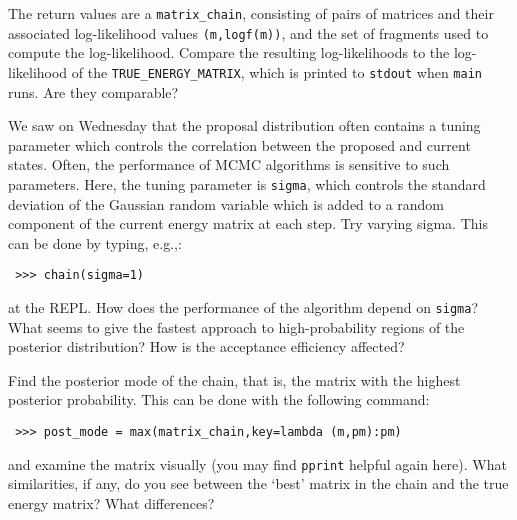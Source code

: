 \documentclass[11pt]{article}
\begin{document}
  The return values are a \texttt{matrix\_chain}, consisting of pairs of
  matrices and their associated log-likelihood values \texttt{(m,logf(m))},
  and the set of fragments used to compute the log-likelihood.
  Compare the resulting log-likelihoods to the log-likelihood of the
  \texttt{TRUE\_ENERGY\_MATRIX}, which is printed to \texttt{stdout} when \texttt{main} runs.
  Are they comparable?



  We saw on Wednesday that the proposal distribution often contains a
  tuning parameter which controls the correlation between the proposed
  and current states.  Often, the performance of MCMC algorithms is
  sensitive to such parameters.  Here, the tuning parameter is
  \texttt{sigma}, which controls the standard deviation of the Gaussian
  random variable which is added to a random component of the current
  energy matrix at each step.  Try varying sigma.  This can be done by
  typing, e.g.,:

\begin{verbatim}
 >>> chain(sigma=1)
\end{verbatim}

  at the REPL.  How does the performance of the algorithm depend on
  \texttt{sigma}?  What seems to give the fastest approach to
  high-probability regions of the posterior distribution?  How is the
  acceptance efficiency affected?

  Find the posterior mode of the chain, that is, the matrix with the
  highest posterior probability.  This can be done with the following command:

\begin{verbatim}
 >>> post_mode = max(matrix_chain,key=lambda (m,pm):pm)
\end{verbatim}

  and examine the matrix visually (you may find \texttt{pprint} helpful again
  here).  What similarities, if any, do you see between the `best'
  matrix in the chain and the true energy matrix?  What differences?
\end{document}

